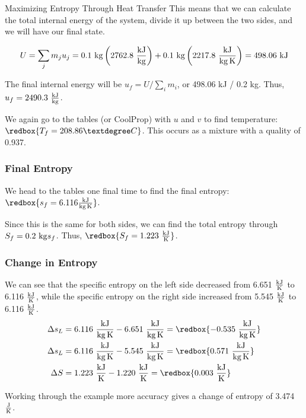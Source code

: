 \begin{example}[label=ex:entropyMaximization]{Maximizing Entropy Through Heat Transfer}
  This means that we can calculate the total internal energy of the system, divide it up between the two sides, and we will have our final state.

  \begin{equation*}
    U = \sum_j m_j u_j = 0.1\ {\rm kg} \left(2762.8\ \frac{\rm kJ}{\rm kg}\right) + 0.1\ {\rm kg} \left(2217.8\ \frac{\rm kJ}{\rm kg\,K}\right) =  498.06 \ \rm kJ
  \end{equation*}

  The final internal energy will be $u_f = U/\sum_i m_i$, or 498.06 kJ / 0.2 kg.  Thus, $u_f = 2490.3 \ \frac{\rm kJ}{\rm kg}$.

  We again go to the tables (or CoolProp) with $u$ and $v$ to find temperature: $\redbox{ T_f = 208.86°C }$.  This occurs as a mixture with a quality of 0.937.

  \subsubsection*{Final Entropy}
  We head to the tables one final time to find the final entropy: $\redbox{s_f = 6.116 \frac{\rm kJ}{\rm kg\,K}}$.

  Since this is the same for both sides, we can find the total entropy through $S_f = 0.2\ {\rm kg} s_f$.  Thus, $\redbox{S_f = 1.223 \ \frac{\rm kJ}{\rm K}}$.

  \subsubsection*{Change in Entropy}
  We can see that the specific entropy on the left side decreased from 6.651$\ \frac{\rm kJ}{\rm K}$ to 6.116$\ \frac{\rm kJ}{\rm K}$, while the specific entropy on the right side increased from 5.545$\ \frac{\rm kJ}{\rm K}$ to 6.116$\ \frac{\rm kJ}{\rm K}$.
  \begin{align*}
    \Delta s_L &= 6.116\ \frac{\rm kJ}{\rm kg\,K} - 6.651\ \frac{\rm kJ}{\rm kg\,K} = \redbox{-0.535\ \frac{\rm kJ}{\rm kg\,K}} \\
    \Delta s_L &= 6.116\ \frac{\rm kJ}{\rm kg\,K} - 5.545\ \frac{\rm kJ}{\rm kg\,K} = \redbox{0.571\ \frac{\rm kJ}{\rm kg\,K}} \\
    \Delta S &= 1.223\ \frac{\rm kJ}{\rm K} - 1.220 \ \frac{\rm kJ}{\rm K} = \redbox{0.003 \ \frac{\rm kJ}{\rm K}}
  \end{align*}

  Working through the example more accuracy gives a change of entropy of 3.474 $\frac{\rm J}{\rm K}$.


\end{example}

